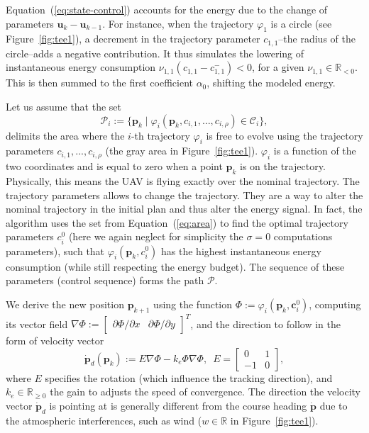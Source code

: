 \documentclass[letterpaper,10pt,conference]{ieeeconf}
\theoremstyle{definition}
\begin{document}
Equation~(\ref{eq:state-control}) accounts for the energy due to the change of parameters $\mathbf{u}_k-\mathbf{u}_{k-1}$. For instance, when the trajectory $\varphi_1$ is a circle (see Figure~\ref{fig:tee1}), a decrement in the trajectory parameter $c_{1,1}$--the radius of the circle--adds a negative contribution. It thus simulates the lowering of instantaneous energy consumption $\nu_{1,1}(c_{1,1}-c_{1,1}^-)<0$, for a given $\nu_{1,1}\in\mathbb{R}_{<0}$. This is then summed to the first coefficient $\alpha_0$, shifting the modeled energy.

Let us assume that the set
\begin{equation}\label{eq:area}
  \mathcal{P}_i:=\{\mathbf{p}_k\mid\varphi_i(\mathbf{p}_k,c_{i,1},\dots,c_{i,\rho})\in\mathcal{C}_i\},
\end{equation}
delimits the area where the $i$-th trajectory $\varphi_i$ is free to evolve using the trajectory parameters $c_{i,1},...,c_{i,\rho}$ (the gray area in Figure~\ref{fig:tee1}). $\varphi_i$ is a function of the two coordinates and is equal to zero when a point $\mathbf{p}_k$ is on the trajectory. Physically, this means the UAV is flying exactly over the nominal trajectory. The trajectory parameters allows to change the trajectory. They are a way to alter the nominal trajectory in the initial plan and thus alter the energy signal.
In fact, the algorithm uses the set from Equation~(\ref{eq:area}) to find the optimal trajectory parameters $c_i^0$ (here we again neglect for simplicity the $\sigma=0$ computations parameters), such that $\varphi_i(\mathbf{p}_k,c_i^0)$ has the highest instantaneous energy consumption (while still respecting the energy budget). The sequence of these parameters (control sequence) forms the path $\mathcal{P}$.

We derive the new position $\mathbf{p}_{k+1}$ using the function $\varPhi:=\varphi_i(\mathbf{p}_k,\mathbf{c}_i^0)$, computing its vector field $\nabla\varPhi:=\begin{bmatrix}\partial\varPhi/\partial x & \partial\varPhi/\partial y\end{bmatrix}^T$, and the direction to follow in the form of velocity vector~\cite{de2017guidance}
\begin{equation*}\label{eq:pd}
  \dot{\mathbf{p}}_d(\mathbf{p}_k):=E\nabla\varPhi-k_e\varPhi\nabla\varPhi,\,\,\,E=\begin{bmatrix}
    0&1\\-1&0
  \end{bmatrix},
\end{equation*}
where $E$ specifies the rotation (which influence the tracking direction), and $k_e\in\mathbb{R}_{\geq 0}$ the gain to adjusts the speed of convergence. The direction the velocity vector $\dot{\mathbf{p}}_d$ is pointing at is generally different from the course heading $\dot{\mathbf{p}}$ due to the atmospheric interferences, such as wind ($w\in\mathbb{R}$ in Figure~\ref{fig:tee1}).
\end{document}
